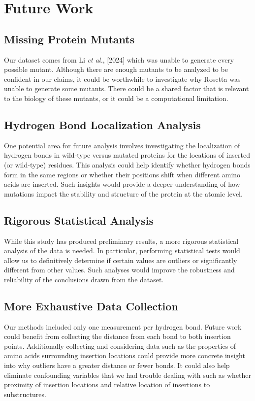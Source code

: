 \documentclass[sigconf, screen, authorversion, authoraddress=false, oneside]{acmart}
\begin{document}
\section{Future Work}

\subsection{Missing Protein Mutants}
Our dataset comes from Li \textit{et al.}, [2024] \cite{10.1093/bioadv/vbae138} which was unable to generate every possible mutant. Although there are enough mutants to be analyzed to be confident in our claims, it could be worthwhile to investigate why Rosetta was unable to generate some mutants. There could be a shared factor that is relevant to the biology of these mutants, or it could be a computational limitation.

\subsection{Hydrogen Bond Localization Analysis}
One potential area for future analysis involves investigating the localization of hydrogen bonds in wild-type versus mutated proteins for the locations of inserted (or wild-type) residues. This analysis could help identify whether hydrogen bonds form in the same regions or whether their positions shift when different amino acids are inserted. Such insights would provide a deeper understanding of how mutations impact the stability and structure of the protein at the atomic level.

\subsection{Rigorous Statistical Analysis}
While this study has produced preliminary results, a more rigorous statistical analysis of the data is needed. In particular, performing statistical tests would allow us to definitively determine if certain values are outliers or significantly different from other values. Such analyses would improve the robustness and reliability of the conclusions drawn from the dataset.

\subsection{More Exhaustive Data Collection}
Our methods included only one measurement per hydrogen bond. Future work could benefit from collecting the distance from each bond to both insertion points. Additionally collecting and considering data such as the properties of amino acids surrounding insertion locations could provide more concrete insight into why outliers have a greater distance or fewer bonds. It could also help eliminate confounding variables that we had trouble dealing with such as whether proximity of insertion locations and relative location of insertions to substructures.



\printbibliography
\end{document}
